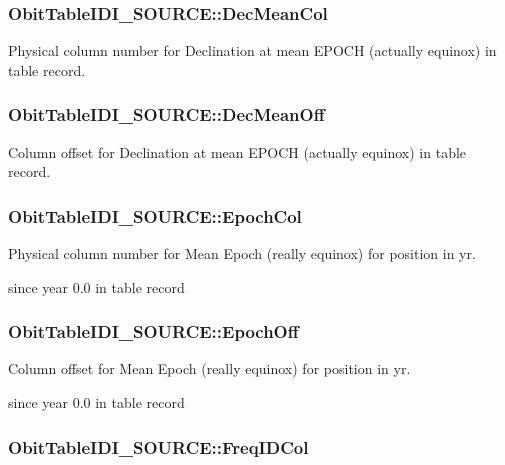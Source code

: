 \subsubsection{ {\bf Obit\-Table\-IDI\_\-SOURCE::Dec\-Mean\-Col}}\label{structObitTableIDI__SOURCE_o35}


Physical column number for Declination at mean EPOCH (actually equinox) in table record. 

\subsubsection{ {\bf Obit\-Table\-IDI\_\-SOURCE::Dec\-Mean\-Off}}\label{structObitTableIDI__SOURCE_o34}


Column offset for Declination at mean EPOCH (actually equinox) in table record. 

\subsubsection{ {\bf Obit\-Table\-IDI\_\-SOURCE::Epoch\-Col}}\label{structObitTableIDI__SOURCE_o37}


Physical column number for Mean Epoch (really equinox) for position in yr. 

since year 0.0 in table record 
\subsubsection{ {\bf Obit\-Table\-IDI\_\-SOURCE::Epoch\-Off}}\label{structObitTableIDI__SOURCE_o36}


Column offset for Mean Epoch (really equinox) for position in yr. 

since year 0.0 in table record 
\subsubsection{ {\bf Obit\-Table\-IDI\_\-SOURCE::Freq\-IDCol}}\label{structObitTableIDI__SOURCE_o31}


